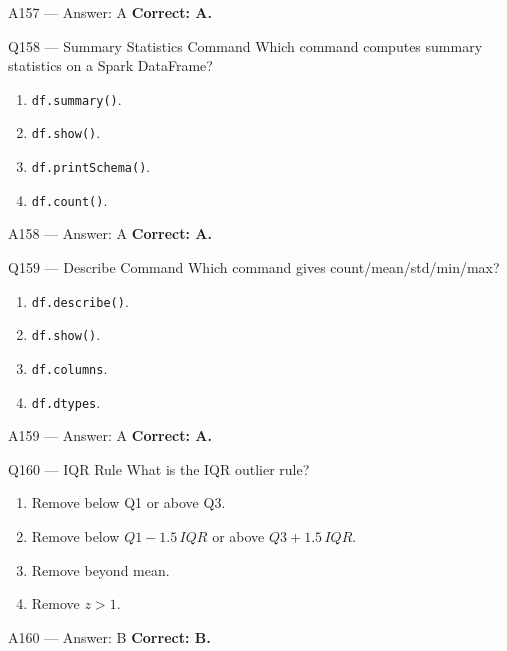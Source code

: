 \documentclass[aspectratio=169,9pt]{beamer}
\begin{document}
	\begin{frame}{A157 --- Answer: A}
		\textbf{Correct: A.}
	\end{frame}
	
	\begin{frame}{Q158 --- Summary Statistics Command}
		Which command computes summary statistics on a Spark DataFrame?
		\begin{enumerate}[label=\Alph*.]
			\item \texttt{df.summary()}.
			\item \texttt{df.show()}.
			\item \texttt{df.printSchema()}.
			\item \texttt{df.count()}.
		\end{enumerate}
	\end{frame}
	
	\begin{frame}{A158 --- Answer: A}
		\textbf{Correct: A.}
	\end{frame}
	
	\begin{frame}{Q159 --- Describe Command}
		Which command gives count/mean/std/min/max?
		\begin{enumerate}[label=\Alph*.]
			\item \texttt{df.describe()}.
			\item \texttt{df.show()}.
			\item \texttt{df.columns}.
			\item \texttt{df.dtypes}.
		\end{enumerate}
	\end{frame}
	
	\begin{frame}{A159 --- Answer: A}
		\textbf{Correct: A.}
	\end{frame}
	
	\begin{frame}{Q160 --- IQR Rule}
		What is the IQR outlier rule?
		\begin{enumerate}[label=\Alph*.]
			\item Remove below Q1 or above Q3.
			\item Remove below $Q1 - 1.5\,IQR$ or above $Q3 + 1.5\,IQR$.
			\item Remove beyond mean.
			\item Remove $z>1$.
		\end{enumerate}
	\end{frame}
	
	\begin{frame}{A160 --- Answer: B}
		\textbf{Correct: B.}
	\end{frame}
	
\end{document}
